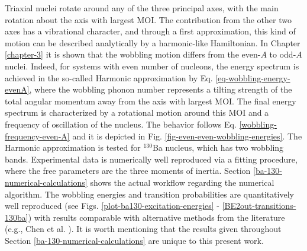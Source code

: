 Triaxial nuclei rotate around any of the three principal axes, with the main rotation about the axis with largest MOI. The contribution from the other two axes has a vibrational character, and through a first approximation, this kind of motion can be described analytically by a harmonic-like Hamiltonian. In Chapter \ref{chapter-3} it is shown that the wobbling motion differs from the even-$A$ to odd-$A$ nuclei. Indeed, for systems with even number of nucleons, the energy spectrum is achieved in the so-called Harmonic approximation by Eq. \eqref{eq-wobbling-energy-evenA}, where the wobbling phonon number represents a tilting strength of the total angular momentum away from the axis with largest MOI. The final energy spectrum is characterized by a rotational motion around this MOI and a frequency of oscillation of the nucleus. The behavior follows Eq. \eqref{wobbling-frequency-even-A} and it is depicted in Fig. \ref{fig-even-even-wobbling-energies}. The Harmonic approximation is tested for $^{130}$Ba nucleus, which has two wobbling bands. Experimental data is numerically well reproduced via a fitting procedure, where the free parameters are the three moments of inertia. Section \ref{ba-130-numerical-calculations} shows the actual workflow regarding the numerical algorithm. The wobbling energies and transition probabilities are quantitatively well reproduced (see Figs. \ref{plot-ba130-excitation-energies} - \ref{BE2out-transitions-130ba}) with results comparable with alternative methods from the literature (e.g., Chen et al. \cite{chen2019transverse}). It is worth mentioning that the results given throughout Section \ref{ba-130-numerical-calculations} are unique to this present work. 

